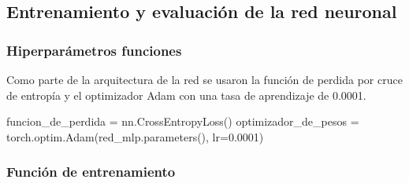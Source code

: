 \documentclass[
  10pt,
]{article}
\newenvironment{Shaded}{\begin{snugshade}}{\end{snugshade}}
\newcommand{\FloatTok}[1]{\textcolor[rgb]{0.68,0.00,0.00}{#1}}
\newcommand{\NormalTok}[1]{\textcolor[rgb]{0.00,0.23,0.31}{#1}}
\newcommand{\OperatorTok}[1]{\textcolor[rgb]{0.37,0.37,0.37}{#1}}
\begin{document}
\subsection{Entrenamiento y evaluación de la red
neuronal}\label{entrenamiento-y-evaluaciuxf3n-de-la-red-neuronal}

\subsubsection{Hiperparámetros
funciones}\label{hiperparuxe1metros-funciones}

Como parte de la arquitectura de la red se usaron la función de perdida
por cruce de entropía y el optimizador Adam con una tasa de aprendizaje
de 0.0001.

\begin{Shaded}
\begin{Highlighting}[]
\NormalTok{funcion\_de\_perdida }\OperatorTok{=}\NormalTok{ nn.CrossEntropyLoss()}
\NormalTok{optimizador\_de\_pesos }\OperatorTok{=}\NormalTok{ torch.optim.Adam(red\_mlp.parameters(), lr}\OperatorTok{=}\FloatTok{0.0001}\NormalTok{)}
\end{Highlighting}
\end{Shaded}

\subsubsection{Función de
entrenamiento}\label{funciuxf3n-de-entrenamiento}
\end{document}
